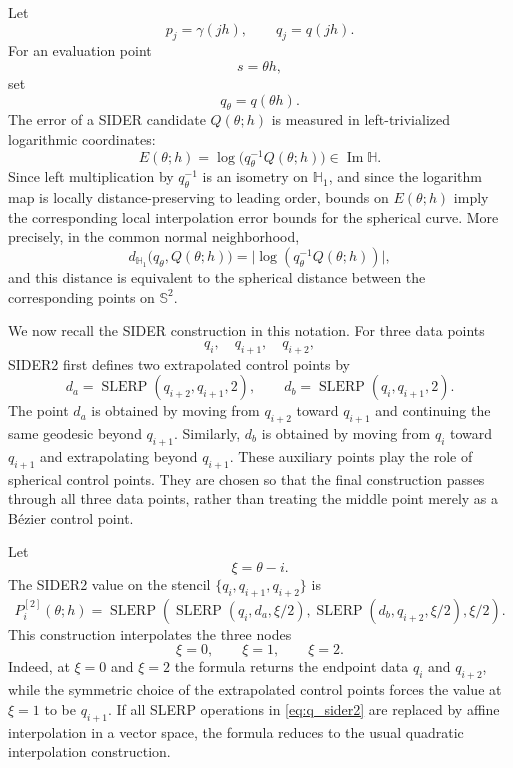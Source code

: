 \documentclass[a4paper,11pt]{article}
\newcommand{\bS}{\mathbb{S}}
\newcommand{\bH}{\mathbb{H}}
\newcommand{\SLERP}{\operatorname{SLERP}}
\newcommand{\ImH}{\operatorname{Im}\bH}
\numberwithin{equation}{section}
\theoremstyle{plain}
\theoremstyle{definition}
\theoremstyle{remark}
\begin{document}
Let
\[
        p_j=\gamma(jh),\qquad q_j=q(jh).
\]
For an evaluation point
\[
        s=\theta h,
\]
set
\[
        q_\theta=q(\theta h).
\]
The error of a SIDER candidate \(Q(\theta;h)\) is measured in
left-trivialized logarithmic coordinates:
\[
        E(\theta;h)
        =
        \log\bigl(q_\theta^{-1}Q(\theta;h)\bigr)
        \in \ImH .
\]
Since left multiplication by \(q_\theta^{-1}\) is an isometry on \(\bH_1\),
and since the logarithm map is locally distance-preserving to leading order,
bounds on \(E(\theta;h)\) imply the corresponding local interpolation error
bounds for the spherical curve.  More precisely, in the common normal
neighborhood,
\[
        d_{\bH_1}\bigl(q_\theta,Q(\theta;h)\bigr)
        =
        \bigl|\log(q_\theta^{-1}Q(\theta;h))\bigr|,
\]
and this distance is equivalent to the spherical distance between the
corresponding points on \(\bS^2\).

We now recall the SIDER construction in this notation.  For three data points
\[
        q_i,\quad q_{i+1},\quad q_{i+2},
\]
SIDER2 first defines two extrapolated control points by
\[
        d_a=\SLERP(q_{i+2},q_{i+1},2),
        \qquad
        d_b=\SLERP(q_i,q_{i+1},2).
\]
The point \(d_a\) is obtained by moving from \(q_{i+2}\) toward \(q_{i+1}\)
and continuing the same geodesic beyond \(q_{i+1}\).  Similarly, \(d_b\) is
obtained by moving from \(q_i\) toward \(q_{i+1}\) and extrapolating beyond
\(q_{i+1}\).  These auxiliary points play the role of spherical control points.
They are chosen so that the final construction passes through all three data
points, rather than treating the middle point merely as a B\'ezier control point.

Let
\[
        \xi=\theta-i.
\]
The SIDER2 value on the stencil
\(\{q_i,q_{i+1},q_{i+2}\}\) is
\begin{equation}
\label{eq:q_sider2}
        P_i^{[2]}(\theta;h)
        =
        \SLERP\!\left(
        \SLERP(q_i,d_a,\xi/2),
        \SLERP(d_b,q_{i+2},\xi/2),
        \xi/2
        \right).
\end{equation}
This construction interpolates the three nodes
\[
        \xi=0,\qquad \xi=1,\qquad \xi=2.
\]
Indeed, at \(\xi=0\) and \(\xi=2\) the formula returns the endpoint data
\(q_i\) and \(q_{i+2}\), while the symmetric choice of the extrapolated control
points forces the value at \(\xi=1\) to be \(q_{i+1}\).  If all SLERP
operations in \eqref{eq:q_sider2} are replaced by affine interpolation in a
vector space, the formula reduces to the usual quadratic interpolation
construction.
\end{document}
